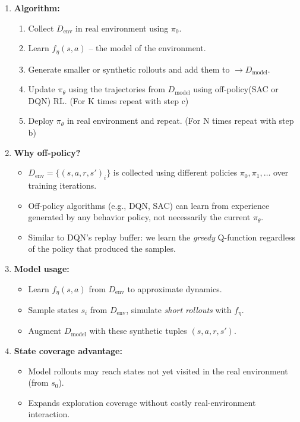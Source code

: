 \documentclass[12pt]{article}
\begin{document}
\begin{enumerate}
    \item \textbf{Algorithm:}
    \begin{enumerate}
        \item Collect $D_{\text{env}}$ in real environment using $\pi_0$.
        \item Learn $f_\eta(s,a)$ -- the model of the environment.
        \item Generate smaller or synthetic rollouts and add them to $\rightarrow D_{\text{model}}$.
        \item Update $\pi_\theta$ using the trajectories from $D_{\text{model}}$ using off-policy(SAC or DQN) RL. (For K times repeat with step c)
        \item Deploy $\pi_\theta$ in real environment and repeat. (For N times repeat with step b)
    \end{enumerate}
    
    \item \textbf{Why off-policy?} 
    \begin{itemize}
        \item $D_{\text{env}} = \{(s,a,r,s')_i\}$ is collected using different policies $\pi_0, \pi_1, \dots$ over training iterations.
        \item Off-policy algorithms (e.g., DQN, SAC) can learn from experience generated by any behavior policy, not necessarily the current $\pi_\theta$.
        \item Similar to DQN's replay buffer: we learn the \emph{greedy} Q-function regardless of the policy that produced the samples.
    \end{itemize}

    \item \textbf{Model usage:}
    \begin{itemize}
        \item Learn $f_\eta(s,a)$ from $D_{\text{env}}$ to approximate dynamics.
        \item Sample states $s_i$ from $D_{\text{env}}$, simulate \emph{short rollouts} with $f_\eta$.
        \item Augment $D_{\text{model}}$ with these synthetic tuples $(s,a,r,s')$.
    \end{itemize}

    \item \textbf{State coverage advantage:}
    \begin{itemize}
        \item Model rollouts may reach states not yet visited in the real environment (from $s_0$).
        \item Expands exploration coverage without costly real-environment interaction.
    \end{itemize}


\end{enumerate}
\end{document}
